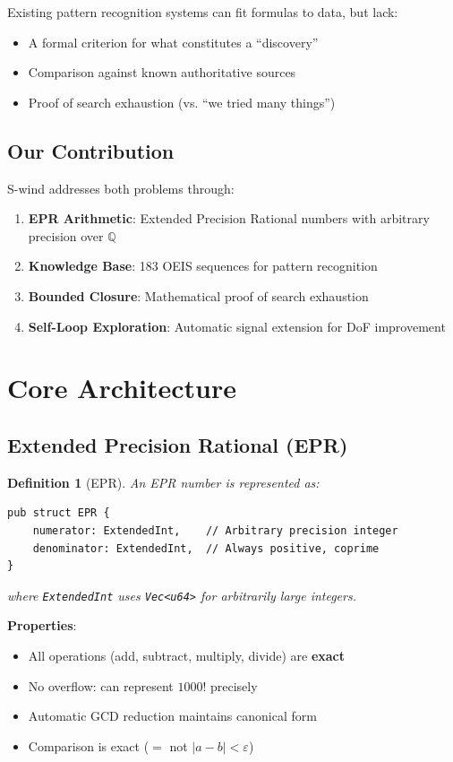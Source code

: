 \documentclass[11pt,a4paper]{article}
\newtheorem{definition}{Definition}
\begin{document}
Existing pattern recognition systems can fit formulas to data, but lack:
\begin{itemize}
    \item A formal criterion for what constitutes a ``discovery''
    \item Comparison against known authoritative sources
    \item Proof of search exhaustion (vs. ``we tried many things'')
\end{itemize}

\subsection{Our Contribution}

S-wind addresses both problems through:
\begin{enumerate}
    \item \textbf{EPR Arithmetic}: Extended Precision Rational numbers with 
    arbitrary precision over $\mathbb{Q}$
    \item \textbf{Knowledge Base}: 183 OEIS sequences for pattern recognition
    \item \textbf{Bounded Closure}: Mathematical proof of search exhaustion
    \item \textbf{Self-Loop Exploration}: Automatic signal extension for DoF 
    improvement
\end{enumerate}

\section{Core Architecture}

\subsection{Extended Precision Rational (EPR)}

\begin{definition}[EPR]
An EPR number is represented as:
\begin{verbatim}
pub struct EPR {
    numerator: ExtendedInt,    // Arbitrary precision integer
    denominator: ExtendedInt,  // Always positive, coprime
}
\end{verbatim}
where \texttt{ExtendedInt} uses \texttt{Vec<u64>} for arbitrarily large integers.
\end{definition}

\textbf{Properties}:
\begin{itemize}
    \item All operations (add, subtract, multiply, divide) are \textbf{exact}
    \item No overflow: can represent $1000!$ precisely
    \item Automatic GCD reduction maintains canonical form
    \item Comparison is exact ($=$ not $|a-b| < \varepsilon$)
\end{itemize}
\end{document}
